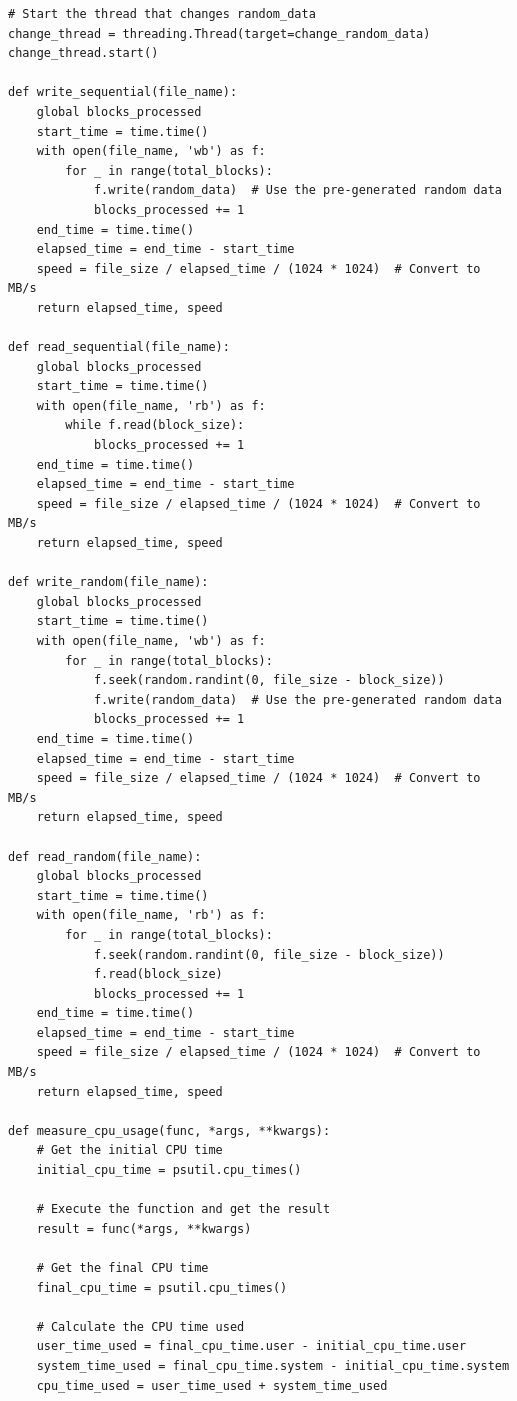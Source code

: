 \begin{lstlisting}[style=Python, caption=Script Python per il benchmarking, label=python-benchmark.py]
# Start the thread that changes random_data
change_thread = threading.Thread(target=change_random_data)
change_thread.start()

def write_sequential(file_name):
    global blocks_processed
    start_time = time.time()
    with open(file_name, 'wb') as f:
        for _ in range(total_blocks):
            f.write(random_data)  # Use the pre-generated random data
            blocks_processed += 1
    end_time = time.time()
    elapsed_time = end_time - start_time
    speed = file_size / elapsed_time / (1024 * 1024)  # Convert to MB/s
    return elapsed_time, speed

def read_sequential(file_name):
    global blocks_processed
    start_time = time.time()
    with open(file_name, 'rb') as f:
        while f.read(block_size):
            blocks_processed += 1
    end_time = time.time()
    elapsed_time = end_time - start_time
    speed = file_size / elapsed_time / (1024 * 1024)  # Convert to MB/s
    return elapsed_time, speed

def write_random(file_name):
    global blocks_processed
    start_time = time.time()
    with open(file_name, 'wb') as f:
        for _ in range(total_blocks):
            f.seek(random.randint(0, file_size - block_size))
            f.write(random_data)  # Use the pre-generated random data
            blocks_processed += 1
    end_time = time.time()
    elapsed_time = end_time - start_time
    speed = file_size / elapsed_time / (1024 * 1024)  # Convert to MB/s
    return elapsed_time, speed

def read_random(file_name):
    global blocks_processed
    start_time = time.time()
    with open(file_name, 'rb') as f:
        for _ in range(total_blocks):
            f.seek(random.randint(0, file_size - block_size))
            f.read(block_size)
            blocks_processed += 1
    end_time = time.time()
    elapsed_time = end_time - start_time
    speed = file_size / elapsed_time / (1024 * 1024)  # Convert to MB/s
    return elapsed_time, speed

def measure_cpu_usage(func, *args, **kwargs):
    # Get the initial CPU time
    initial_cpu_time = psutil.cpu_times()

    # Execute the function and get the result
    result = func(*args, **kwargs)

    # Get the final CPU time
    final_cpu_time = psutil.cpu_times()

    # Calculate the CPU time used
    user_time_used = final_cpu_time.user - initial_cpu_time.user
    system_time_used = final_cpu_time.system - initial_cpu_time.system
    cpu_time_used = user_time_used + system_time_used


\end{lstlisting}
